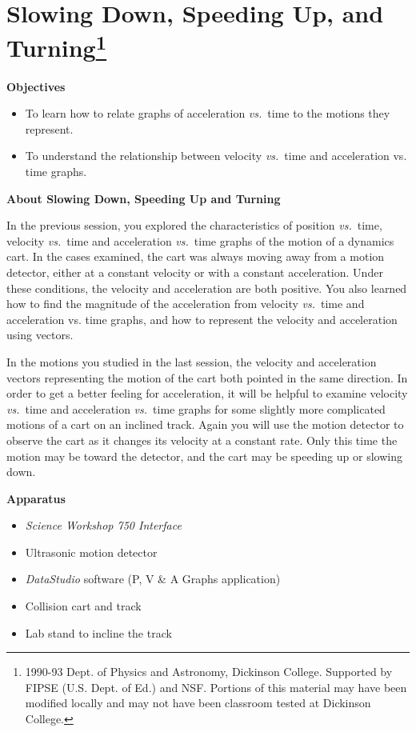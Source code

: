 
\section{Slowing Down, Speeding Up, and Turning\footnote{
1990-93 Dept. of Physics and Astronomy, Dickinson College. Supported by FIPSE
(U.S. Dept. of Ed.) and NSF. Portions of this material may have been modified
locally and may not have been classroom tested at Dickinson College.
}}

\makelabheader %

\medskip
\textbf{Objectives }

\begin{itemize}
\item To learn how to relate graphs of acceleration \textit{vs.}~time to the motions they represent. 
\item To understand the relationship between velocity \textit{vs.}~time and acceleration vs.
time graphs.
\end{itemize}

\medskip
\textbf{About Slowing Down, Speeding Up and Turning }

In the previous session, you explored the characteristics of position \textit{vs.}~time,
velocity \textit{vs.}~time and acceleration  \textit{vs.}~time graphs of the motion of a dynamics
cart. In the cases examined, the cart was always moving away from a motion detector,
either at a constant velocity or with a constant acceleration. Under these conditions,
the velocity and acceleration are both positive. You also learned how to find
the magnitude of the acceleration from velocity \textit{vs.}~time and acceleration vs.
time graphs, and how to represent the velocity and acceleration using vectors. 

In the motions you studied in the last session, the velocity and acceleration
vectors representing the motion of the cart both pointed in the same direction.
In order to get a better feeling for acceleration, it will be helpful to examine
velocity \textit{vs.}~time and acceleration \textit{vs.}~time graphs for some slightly more complicated
motions of a cart on an inclined track. Again you will use the motion detector
to observe the cart as it changes its velocity at a constant rate. Only this
time the motion may be toward the detector, and the cart may be speeding up
or slowing down.

\medskip
\textbf{Apparatus }

\begin{itemize}
\item \textit{Science Workshop 750 Interface}
\item Ultrasonic motion detector 
\item \textit{DataStudio} software (P, V \& A Graphs application)
\item Collision cart and track 
\item Lab stand to incline the track
\end{itemize}


